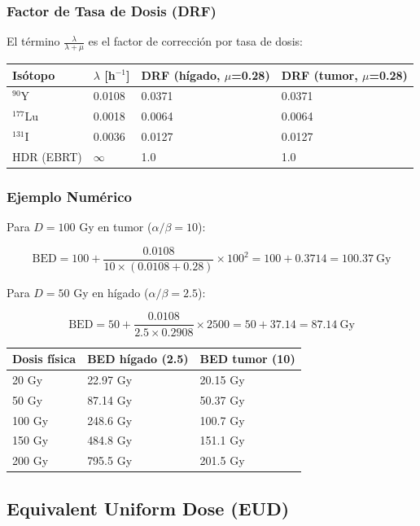 \documentclass[12pt,a4paper]{article}
\begin{document}
\subsubsection{Factor de Tasa de Dosis (DRF)}

El término $\frac{\lambda}{\lambda + \mu}$ es el factor de corrección por tasa de dosis:

\begin{tabular}{p{2cm} p{3cm} p{3.5cm} p{3.5cm}}
\toprule
\textbf{Isótopo} & $\lambda$ [h$^{-1}$] & \textbf{DRF (hígado, $\mu$=0.28)} & \textbf{DRF (tumor, $\mu$=0.28)} \\
\midrule
$^{90}$Y & 0.0108 & 0.0371 & 0.0371 \\
$^{177}$Lu & 0.0018 & 0.0064 & 0.0064 \\
$^{131}$I & 0.0036 & 0.0127 & 0.0127 \\
HDR (EBRT) & $\infty$ & 1.0 & 1.0 \\
\bottomrule
\end{tabular}

\subsubsection{Ejemplo Numérico}

Para $D = 100$ Gy en tumor ($\alpha/\beta = 10$):

$$\text{BED} = 100 + \frac{0.0108}{10 \times (0.0108 + 0.28)} \times 100^2 = 100 + 0.3714 = 100.37\ \text{Gy}$$

Para $D = 50$ Gy en hígado ($\alpha/\beta = 2.5$):

$$\text{BED} = 50 + \frac{0.0108}{2.5 \times 0.2908} \times 2500 = 50 + 37.14 = 87.14\ \text{Gy}$$

\begin{tabular}{p{2.5cm} p{3.5cm} p{3.5cm}}
\toprule
\textbf{Dosis física} & \textbf{BED hígado (2.5)} & \textbf{BED tumor (10)} \\
\midrule
20 Gy & 22.97 Gy & 20.15 Gy \\
50 Gy & 87.14 Gy & 50.37 Gy \\
100 Gy & 248.6 Gy & 100.7 Gy \\
150 Gy & 484.8 Gy & 151.1 Gy \\
200 Gy & 795.5 Gy & 201.5 Gy \\
\bottomrule
\end{tabular}

\subsection{Equivalent Uniform Dose (EUD)}
\end{document}

